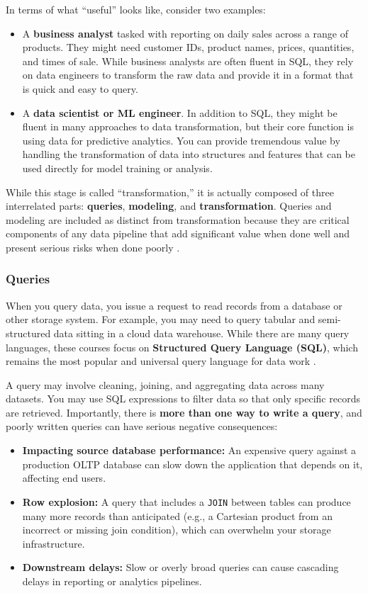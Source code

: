 \documentclass{article}
\begin{document}
In terms of what ``useful'' looks like, consider two examples:
\begin{itemize}
    \item A \textbf{business analyst} tasked with reporting on daily sales across a range of products. They might need customer IDs, product names, prices, quantities, and times of sale. While business analysts are often fluent in SQL, they rely on data engineers to transform the raw data and provide it in a format that is quick and easy to query.
    \item A \textbf{data scientist or ML engineer}. In addition to SQL, they might be fluent in many approaches to data transformation, but their core function is using data for predictive analytics. You can provide tremendous value by handling the transformation of data into structures and features that can be used directly for model training or analysis.
\end{itemize}

While this stage is called ``transformation,'' it is actually composed of three interrelated parts: \textbf{queries}, \textbf{modeling}, and \textbf{transformation}. Queries and modeling are included as distinct from transformation because they are critical components of any data pipeline that add significant value when done well and present serious risks when done poorly \cite{reis2022fundamentals}.

\subsubsection{Queries}
When you query data, you issue a request to read records from a database or other storage system. For example, you may need to query tabular and semi-structured data sitting in a cloud data warehouse. While there are many query languages, these courses focus on \textbf{Structured Query Language (SQL)}, which remains the most popular and universal query language for data work \cite{date2003introduction}.

A query may involve cleaning, joining, and aggregating data across many datasets. You may use SQL expressions to filter data so that only specific records are retrieved. Importantly, there is \textbf{more than one way to write a query}, and poorly written queries can have serious negative consequences:
\begin{itemize}
    \item \textbf{Impacting source database performance:} An expensive query against a production OLTP database can slow down the application that depends on it, affecting end users.
    \item \textbf{Row explosion:} A query that includes a \texttt{JOIN} between tables can produce many more records than anticipated (e.g., a Cartesian product from an incorrect or missing join condition), which can overwhelm your storage infrastructure.
    \item \textbf{Downstream delays:} Slow or overly broad queries can cause cascading delays in reporting or analytics pipelines.
\end{itemize}
\end{document}
